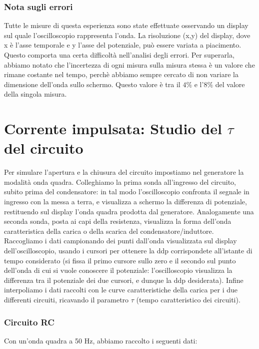 \subsubsection{Nota sugli errori}
Tutte le misure di questa esperienza sono state effettuate osservando un display sul quale l'oscilloscopio rappresenta l'onda. La risoluzione (x,y) del display, dove x è l'asse temporale e y l'asse del potenziale, può essere variata a piacimento. 
Questo comporta una certa difficoltà nell'analisi degli errori. Per superarla, abbiamo notato che l'incertezza di ogni misura sulla misura stessa è un valore che rimane costante nel tempo, perchè abbiamo sempre cercato di non variare la dimensione dell'onda sullo schermo. Questo valore è tra il $4\%$ e l'$8\%$ del valore della singola misura. 


\section{Corrente impulsata: Studio del $\tau$ del circuito}

Per simulare l'apertura e la chiusura del circuito impostiamo nel generatore la modalità onda quadra. Colleghiamo la prima sonda all'ingresso del circuito, subito prima del condensatore: in tal modo l'oscilloscopio confronta il segnale in ingresso con la messa a terra, e visualizza a schermo la differenza di potenziale, restituendo sul display l'onda quadra prodotta dal generatore.  
Analogamente una seconda sonda, posta ai capi della resistenza, visualizza la forma dell'onda caratteristica della carica o della scarica del condensatore/induttore. \\
Raccogliamo i dati campionando dei punti dall'onda visualizzata sul display dell'oscilloscopio, usando i cursori per ottenere la ddp corrispondete all'istante di tempo considerato (si fissa il primo cursore sullo zero e il secondo sul punto dell'onda di cui si vuole conoscere il potenziale: l'oscilloscopio visualizza la differenza tra il potenziale dei due cursori, e dunque la ddp desiderata).
Infine interpoliamo i dati raccolti con le curve caratteristiche della carica per i due differenti circuiti, ricavando il parametro $\tau$ (tempo caratteristico dei circuiti).

\subsubsection{Circuito RC}
Con un'onda quadra a 50 Hz, abbiamo raccolto i seguenti dati:

